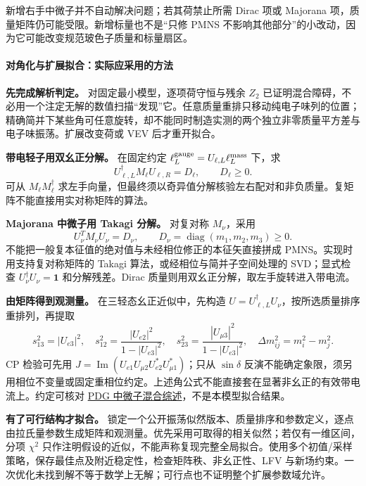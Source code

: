 \documentclass[
]{article}
\begin{document}
新增右手中微子并不自动解决问题；若其荷禁止所需 Dirac 项或 Majorana
项，质量矩阵仍可能受限。新增标量也不是``只修 PMNS
不影响其他部分''的小改动，因为它可能改变规范玻色子质量和标量扇区。

\paragraph{对角化与扩展拟合：实际应采用的方法}\label{ux5bf9ux89d2ux5316ux4e0eux6269ux5c55ux62dfux5408ux5b9eux9645ux5e94ux91c7ux7528ux7684ux65b9ux6cd5}

\textbf{先完成解析判定。} 对固定最小模型，逐项荷守恒与残余 \(Z_2\)
已证明混合障碍，不必用一个注定无解的数值扫描``发现''它。任意质量重排只移动纯电子味列的位置；精确简并下某些角可任意旋转，却不能同时制造实测的两个独立非零质量平方差与电子味振荡。扩展改变荷或
VEV 后才重开拟合。

\textbf{带电轻子用双幺正分解。} 在固定约定
\(\ell_L^{\rm gauge}=U_{\ell,L}\ell_L^{\rm mass}\) 下，求 \[
U_{\ell,L}^\dagger M_\ell U_{\ell,R}=D_\ell,\qquad D_\ell\ge0.
\] 可从 \(M_\ell M_\ell^\dagger\)
求左手向量，但最终须以奇异值分解核验左右配对和非负质量。复矩阵不能直接用实对称矩阵的算法。

\textbf{Majorana 中微子用 Takagi 分解。} 对复对称 \(M_\nu\)，采用 \[
U_\nu^T M_\nu U_\nu=D_\nu,\qquad D_\nu=\operatorname{diag}(m_1,m_2,m_3)\ge0.
\] 不能把一般复本征值的绝对值与未经相位修正的本征矢直接拼成
PMNS。实现时用支持复对称矩阵的 Takagi 算法，或经相位与简并子空间处理的
SVD；显式检查 \(U_\nu^\dagger U_\nu=\mathbf1\) 和分解残差。Dirac
质量则用双幺正分解，取左手旋转进入带电流。

\textbf{由矩阵得到观测量。} 在三轻态幺正近似中，先构造
\(U=U_{\ell,L}^\dagger U_\nu\)，按所选质量排序重排列，再提取 \[
s_{13}^2=|U_{e3}|^2,\quad
s_{12}^2=\frac{|U_{e2}|^2}{1-|U_{e3}|^2},\quad
s_{23}^2=\frac{|U_{\mu3}|^2}{1-|U_{e3}|^2},
\quad\Delta m_{ij}^2=m_i^2-m_j^2.
\] CP 检验可先用
\(J=\operatorname{Im}(U_{e1}U_{\mu2}U_{e2}^*U_{\mu1}^*)\)；只从
\(\sin\delta\)
反演不能确定象限，须另用相位不变量或固定重相位约定。上述角公式不能直接套在显著非幺正的有效带电流上。约定可核对
\href{https://pdg.lbl.gov/2025/reviews/rpp2025-rev-neutrino-mixing.pdf}{PDG
中微子混合综述}，不是本模型拟合结果。

\textbf{有了可行结构才拟合。}
锁定一个公开振荡似然版本、质量排序和参数定义，逐点由拉氏量参数生成矩阵和观测量。优先采用可取得的相关似然；若仅有一维区间，分项
\(\chi^2\)
只作注明假设的近似，不能声称复现完整全局拟合。使用多个初值/采样策略，保存最佳点及附近稳定性，检查矩阵秩、非幺正性、LFV
与新场约束。一次优化未找到解不等于数学上无解；可行点也不证明整个扩展参数域允许。
\end{document}
